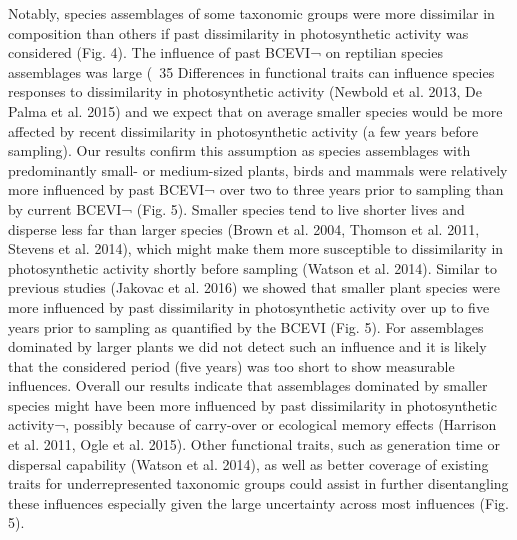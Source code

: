 	Notably, species assemblages of some taxonomic groups were more dissimilar in composition than others if past dissimilarity in photosynthetic activity was considered (Fig. 4). The influence of past BCEVI¬ on reptilian species assemblages was large (~35 %
	Differences in functional traits can influence species responses to dissimilarity in photosynthetic activity (Newbold et al. 2013, De Palma et al. 2015) and we expect that on average smaller species would be more affected by recent dissimilarity in photosynthetic activity (a few years before sampling). Our results confirm this assumption as species assemblages with predominantly small- or medium-sized plants, birds and mammals were relatively more influenced by past BCEVI¬ over two to three years prior to sampling than by current BCEVI¬ (Fig. 5). Smaller species tend to live shorter lives and disperse less far than larger species (Brown et al. 2004, Thomson et al. 2011, Stevens et al. 2014), which might make them more susceptible to dissimilarity in photosynthetic activity shortly before sampling (Watson et al. 2014). Similar to previous studies (Jakovac et al. 2016) we showed that smaller plant species were more influenced by past dissimilarity in photosynthetic activity over up to five years prior to sampling as quantified by the BCEVI (Fig. 5). For assemblages dominated by larger plants we did not detect such an influence and it is likely that the considered period (five years) was too short to show measurable influences. Overall our results indicate that assemblages dominated by smaller species might have been more influenced by past dissimilarity in photosynthetic activity¬,  possibly because of carry-over or ecological memory effects (Harrison et al. 2011, Ogle et al. 2015). Other functional traits, such as generation time or dispersal capability (Watson et al. 2014), as well as better coverage of existing traits for underrepresented taxonomic groups could assist in further disentangling these influences especially given the large uncertainty across most influences (Fig. 5). 
